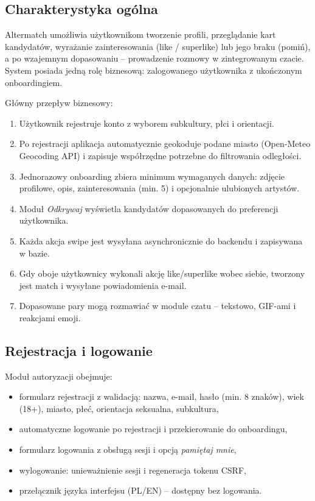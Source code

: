 \documentclass[12pt,a4paper]{article}
\begin{document}
\subsection{Charakterystyka ogólna}

Altermatch umożliwia użytkownikom tworzenie profili, przeglądanie kart kandydatów, wyrażanie zainteresowania (like / superlike) lub jego braku (pomiń), a po wzajemnym dopasowaniu -- prowadzenie rozmowy w zintegrowanym czacie. System posiada jedną rolę biznesową: zalogowanego użytkownika z ukończonym onboardingiem.

Główny przepływ biznesowy:
\begin{enumerate}
    \item Użytkownik rejestruje konto z wyborem subkultury, płci i orientacji.
    \item Po rejestracji aplikacja automatycznie geokoduje podane miasto (Open-Meteo Geocoding API) i zapisuje współrzędne potrzebne do filtrowania odległości.
    \item Jednorazowy onboarding zbiera minimum wymaganych danych: zdjęcie profilowe, opis, zainteresowania (min. 5) i opcjonalnie ulubionych artystów.
    \item Moduł \textit{Odkrywaj} wyświetla kandydatów dopasowanych do preferencji użytkownika.
    \item Każda akcja swipe jest wysyłana asynchronicznie do backendu i zapisywana w bazie.
    \item Gdy oboje użytkownicy wykonali akcję like/superlike wobec siebie, tworzony jest match i wysyłane powiadomienia e-mail.
    \item Dopasowane pary mogą rozmawiać w module czatu -- tekstowo, GIF-ami i reakcjami emoji.
\end{enumerate}

\subsection{Rejestracja i logowanie}

Moduł autoryzacji obejmuje:
\begin{itemize}
    \item formularz rejestracji z walidacją: nazwa, e-mail, hasło (min. 8 znaków), wiek (18+), miasto, płeć, orientacja seksualna, subkultura,
    \item automatyczne logowanie po rejestracji i przekierowanie do onboardingu,
    \item formularz logowania z obsługą sesji i opcją \textit{pamiętaj mnie},
    \item wylogowanie: unieważnienie sesji i regeneracja tokenu CSRF,
    \item przełącznik języka interfejsu (PL/EN) -- dostępny bez logowania.
\end{itemize}
\end{document}
